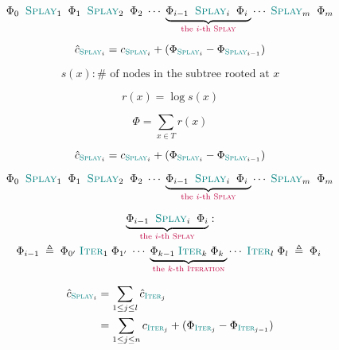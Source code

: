 \begin{frame}{}
  \[
    \Phi_{0}\;\; \textsc{\textcolor{teal}{Splay}}_{1} \;\;
    \Phi_{1}\;\; \textsc{\textcolor{teal}{Splay}}_{2} \;\;
    \Phi_{2}\;
    \cdots\;
    \underbrace{\Phi_{i-1}\;\; \textsc{\textcolor{teal}{Splay}}_{i}\;\; \Phi_{i}\;}_{\textcolor{purple}{\text{the $i$-th \textsc{Splay}}}}
    \cdots\;
    \textsc{\textcolor{teal}{Splay}}_{m}\;\; 
    \Phi_{m}
  \]

  \[
    \hat{c}_{\textsc{\textcolor{teal}{Splay}}_{i}} =  c_{\textsc{\textcolor{teal}{Splay}}_{i}} + (\Phi_{\textsc{\textcolor{teal}{Splay}}_{i}} - \Phi_{\textsc{\textcolor{teal}{Splay}}_{i-1}})
  \]

  \pause
  \vspace{0.60cm}
  \begin{center}
  \end{center}
\end{frame}

\begin{frame}{}
  \[
    s(x): \# \text{ of nodes in the subtree rooted at } x
  \]

  \pause
  \[
    r(x) = \log s(x)
  \]

  \pause
  \[
    \Phi = \sum_{x \in T} r(x)
  \]

  \pause
  \vspace{0.50cm}
  \begin{center}
  \end{center}

  \[
    \hat{c}_{\textsc{\textcolor{teal}{Splay}}_{i}} =  c_{\textsc{\textcolor{teal}{Splay}}_{i}} + (\Phi_{\textsc{\textcolor{teal}{Splay}}_{i}} - \Phi_{\textsc{\textcolor{teal}{Splay}}_{i-1}})
  \]
\end{frame}

\begin{frame}{}
  \[
    \Phi_{0}\;\; \textsc{\textcolor{teal}{Splay}}_{1} \;\;
    \Phi_{1}\;\; \textsc{\textcolor{teal}{Splay}}_{2} \;\;
    \Phi_{2}\;
    \cdots\;
    \underbrace{\Phi_{i-1}\;\; \textsc{\textcolor{teal}{Splay}}_{i}\;\; \Phi_{i}\;}_{\textcolor{purple}{\text{the $i$-th \textsc{Splay}}}}
    \cdots\;
    \textsc{\textcolor{teal}{Splay}}_{m}\;\; 
    \Phi_{m}
  \]

  \pause
  \begin{gather*}
    \underbrace{\Phi_{i-1}\;\; \textsc{\textcolor{teal}{Splay}}_{i}\;\; \Phi_{i}}_{\textcolor{purple}{\text{the $i$-th \textsc{Splay}}}}: \\
    \Phi_{i-1} \;\triangleq\; \Phi_{0'}\; \textsc{\textcolor{teal}{Iter}}_{1}\; \Phi_{1'}\; 
    \cdots\;
    \underbrace{\Phi_{k-1}\; \textsc{\textcolor{teal}{Iter}}_{k}\; \Phi_{k}\;}_{\textcolor{purple}{\text{the $k$-th \textsc{Iteration}}}}
    \cdots\;
    \textsc{\textcolor{teal}{Iter}}_{l}\; \Phi_{l} \;\triangleq\; \Phi_{i}\;
  \end{gather*}

  \pause
  \begin{align*}
    \hat{c}_{\textsc{\textcolor{teal}{Splay}}_{i}} &= \sum_{1 \le j \le l} \hat{c}_{\textsc{\textcolor{teal}{Iter}}_{j}} \\
      &= \sum_{1 \le j \le n} c_{\textsc{\textcolor{teal}{Iter}}_{j}} + (\Phi_{\textsc{\textcolor{teal}{Iter}}_{j}} - \Phi_{\textsc{\textcolor{teal}{Iter}}_{j-1}})
  \end{align*}
\end{frame}


